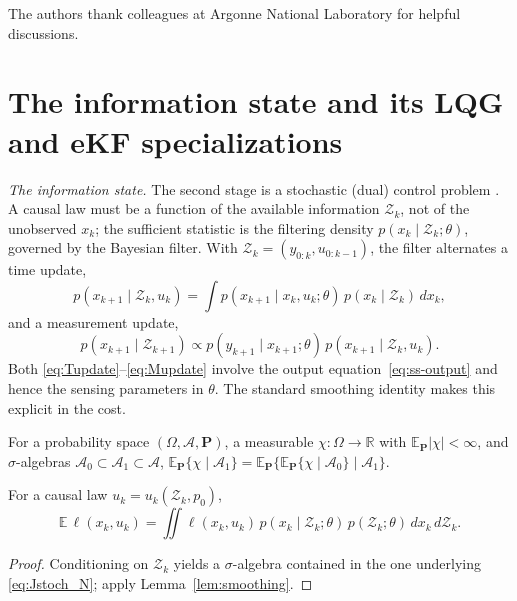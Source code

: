 \documentclass[twocolumn,amsthm]{autart}
\begin{document}
\begin{ack}
The authors thank colleagues at Argonne National Laboratory for helpful
discussions.
\end{ack}

\appendix

\section{The information state and its LQG and eKF specializations}\label{app:infostate}

\emph{The information state.}
The second stage is a stochastic (dual) control problem
\cite{feldbaum1960dual,bar1974dual}. A causal law must be a function of the
available information $\mathcal{Z}_k$, not of the unobserved $x_k$; the
sufficient statistic is the filtering density $p(x_k \mid \mathcal{Z}_k;\theta)$,
governed by the Bayesian filter. With $\mathcal{Z}_k = (y_{0:k}, u_{0:k-1})$, the
filter alternates a time update,
\begin{equation}\label{eq:Tupdate}
p(x_{k+1} \mid \mathcal{Z}_k, u_k) = \int p(x_{k+1} \mid x_k, u_k;\theta)\,
p(x_k \mid \mathcal{Z}_k)\, dx_k,
\end{equation}
and a measurement update,
\begin{equation}\label{eq:Mupdate}
p(x_{k+1} \mid \mathcal{Z}_{k+1}) \propto p(y_{k+1} \mid x_{k+1};\theta)\,
p(x_{k+1} \mid \mathcal{Z}_k, u_k).
\end{equation}
Both \eqref{eq:Tupdate}--\eqref{eq:Mupdate} involve the output
equation~\eqref{eq:ss-output} and hence the sensing parameters in $\theta$. The
standard smoothing identity makes this explicit in the cost.

\begin{lem}\label{lem:smoothing}
For a probability space $(\Omega,\mathcal{A},\mathbf{P})$, a measurable
$\chi:\Omega\to\mathbb{R}$ with $\mathbb{E}_{\mathbf P}|\chi|<\infty$, and
$\sigma$-algebras $\mathcal{A}_0 \subset \mathcal{A}_1 \subset \mathcal{A}$,
$\mathbb{E}_{\mathbf P}\{\chi \mid \mathcal{A}_1\} =
\mathbb{E}_{\mathbf P}\{\mathbb{E}_{\mathbf P}\{\chi \mid \mathcal{A}_0\} \mid
\mathcal{A}_1\}$.
\end{lem}

\begin{lem}\label{lem:stagecost}
For a causal law $u_k = u_k(\mathcal{Z}_k, p_0)$,
\begin{equation*}
\mathbb{E}\,\ell(x_k,u_k) = \!\iint \ell(x_k,u_k)\,
p(x_k \mid \mathcal{Z}_k;\theta)\, p(\mathcal{Z}_k;\theta)\, dx_k\, d\mathcal{Z}_k.
\end{equation*}
\end{lem}
\begin{proof}
Conditioning on $\mathcal{Z}_k$ yields a $\sigma$-algebra contained in the one
underlying \eqref{eq:Jstoch_N}; apply Lemma~\ref{lem:smoothing}.
\end{proof}
\end{document}
